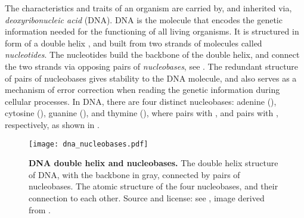 
The characteristics and traits of an organism are carried by, and inherited via, \emph{deoxyribonucleic acid} (DNA).
DNA is the molecule that encodes the genetic information needed for the functioning of all living organisms.
It is structured in form of a double helix \cite{Watson1953},
and built from two strands of molecules called \emph{nucleotides}.
The nucleotides build the backbone of the double helix,
and connect the two strands via opposing pairs of \emph{nucleobases}, see .
The redundant structure of pairs of nucleobases gives stability to the DNA molecule,
and also serves as a mechanism of error correction when reading the genetic information during cellular processes.
In DNA, there are four distinct nucleobases:
adenine (), cytosine (), guanine (), and thymine (),
where  pairs with , and  pairs with , respectively,
as shown in .

\begin{figure}[hpbt]
    \centering
    \texttt{[image: dna\_nucleobases.pdf]}
    \begin{subfigure}{0pt}
        \label{fig:dna_nucleobases:sub:dna_helix}
    \end{subfigure}
    \begin{subfigure}{0pt}
        \label{fig:dna_nucleobases:sub:nucleobases}
    \end{subfigure}
    \caption[DNA double helix and nucleobases]{
        \textbf{DNA double helix and nucleobases.}
        The double helix structure of DNA, with the backbone in gray,
        connected by pairs of nucleobases.
        The atomic structure of the four nucleobases, and their connection to each other.
        Source and license: see \cite{Czech2018DNA},
        image derived from \cite{MesserWoland2006,Sponk2010,Yikrazuul2008a,Yikrazuul2008b}.
    }
    \label{fig:dna_nucleobases}
\end{figure}


